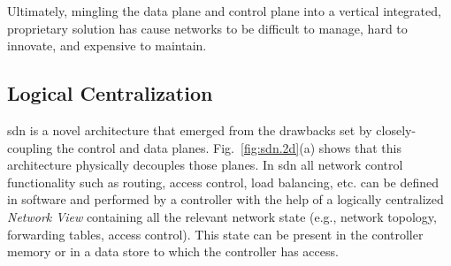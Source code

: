 Ultimately, mingling the data plane and control plane into a vertical integrated, proprietary solution has cause networks to be difficult to manage, hard to innovate, and expensive to maintain. 



\subsection{Logical Centralization} 
\gls{sdn} is a novel architecture that emerged from the drawbacks set by closely-coupling the control and data planes. 
Fig.~\ref{fig:sdn.2d}(a) shows that this architecture  physically decouples those planes. 
In \gls{sdn} all network control functionality  such as routing, access control, load balancing, etc. can be defined in software and performed by a controller with the help of a logically centralized \emph{Network View} containing  all the relevant network state (e.g., network topology, forwarding tables, access control). 
This state can be present in the controller memory or in a data store to which the controller has access.




